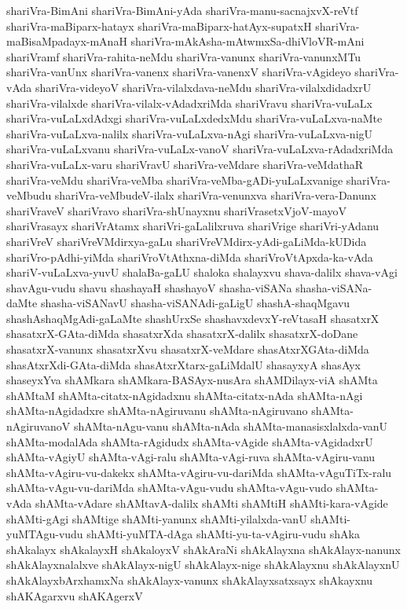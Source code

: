 {shariVra-BimAni
shariVra-BimAni-yAda
shariVra-manu-sacnajxvX-reVtf
shariVra-maBiparx-hatayx
shariVra-maBiparx-hatAyx-supatxH
shariVra-maBisaMpadayx-mAnaH
shariVra-mAkAsha-mAtwmxSa-dhiVloVR-mAni
shariVramf
shariVra-rahita-neMdu
shariVra-vanunx
shariVra-vanunxMTu
shariVra-vanUnx
shariVra-vanenx
shariVra-vanenxV
shariVra-vAgideyo
shariVra-vAda
shariVra-videyoV
shariVra-vilalxdava-neMdu
shariVra-vilalxdidadxrU
shariVra-vilalxde
shariVra-vilalx-vAdadxriMda
shariVravu
shariVra-vuLaLx
shariVra-vuLaLxdAdxgi
shariVra-vuLaLxdedxMdu
shariVra-vuLaLxva-naMte
shariVra-vuLaLxva-nalilx
shariVra-vuLaLxva-nAgi
shariVra-vuLaLxva-nigU
shariVra-vuLaLxvanu
shariVra-vuLaLx-vanoV
shariVra-vuLaLxva-rAdadxriMda
shariVra-vuLaLx-varu
shariVravU
shariVra-veMdare
shariVra-veMdathaR
shariVra-veMdu
shariVra-veMba
shariVra-veMba-gADi-yuLaLxvanige
shariVra-veMbudu
shariVra-veMbudeV-ilalx
shariVra-venunxva
shariVra-vera-Danunx
shariVraveV
shariVravo
shariVra-shUnayxnu
shariVrasetxVjoV-mayoV
shariVrasayx
shariVrAtamx
shariVri-gaLalilxruva
shariVrige
shariVri-yAdanu
shariVreV
shariVreVMdirxya-gaLu
shariVreVMdirx-yAdi-gaLiMda-kUDida
shariVro-pAdhi-yiMda
shariVroVtAthxna-diMda
shariVroVtApxda-ka-vAda
shariV-vuLaLxva-yuvU
shalaBa-gaLU
shaloka
shalayxvu
shava-dalilx
shava-vAgi
shavAgu-vudu
shavu
shashayaH
shashayoV
shasha-viSANa
shasha-viSANa-daMte
shasha-viSANavU
shasha-viSANAdi-gaLigU
shashA-shaqMgavu
shashAshaqMgAdi-gaLaMte
shashUrxSe
shashavxdevxY-reVtasaH
shasatxrX
shasatxrX-GAta-diMda
shasatxrXda
shasatxrX-dalilx
shasatxrX-doDane
shasatxrX-vanunx
shasatxrXvu
shasatxrX-veMdare
shasAtxrXGAta-diMda
shasAtxrXdi-GAta-diMda
shasAtxrXtarx-gaLiMdalU
shasayxyA
shasAyx
shaseyxYva
shAMkara
shAMkara-BASAyx-nusAra
shAMDilayx-viA
shAMta
shAMtaM
shAMta-citatx-nAgidadxnu
shAMta-citatx-nAda
shAMta-nAgi
shAMta-nAgidadxre
shAMta-nAgiruvanu
shAMta-nAgiruvano
shAMta-nAgiruvanoV
shAMta-nAgu-vanu
shAMta-nAda
shAMta-manasisxlalxda-vanU
shAMta-modalAda
shAMta-rAgidudx
shAMta-vAgide
shAMta-vAgidadxrU
shAMta-vAgiyU
shAMta-vAgi-ralu
shAMta-vAgi-ruva
shAMta-vAgiru-vanu
shAMta-vAgiru-vu-dakekx
shAMta-vAgiru-vu-dariMda
shAMta-vAguTiTx-ralu
shAMta-vAgu-vu-dariMda
shAMta-vAgu-vudu
shAMta-vAgu-vudo
shAMta-vAda
shAMta-vAdare
shAMtavA-dalilx
shAMti
shAMtiH
shAMti-kara-vAgide
shAMti-gAgi
shAMtige
shAMti-yanunx
shAMti-yilalxda-vanU
shAMti-yuMTAgu-vudu
shAMti-yuMTA-dAga
shAMti-yu-ta-vAgiru-vudu
shAka
shAkalayx
shAkalayxH
shAkaloyxV
shAkAraNi
shAkAlayxna
shAkAlayx-nanunx
shAkAlayxnalalxve
shAkAlayx-nigU
shAkAlayx-nige
shAkAlayxnu
shAkAlayxnU
shAkAlayxbArxhamxNa
shAkAlayx-vanunx
shAkAlayxsatxsayx
shAkayxnu
shAKAgarxvu
shAKAgerxV
}
